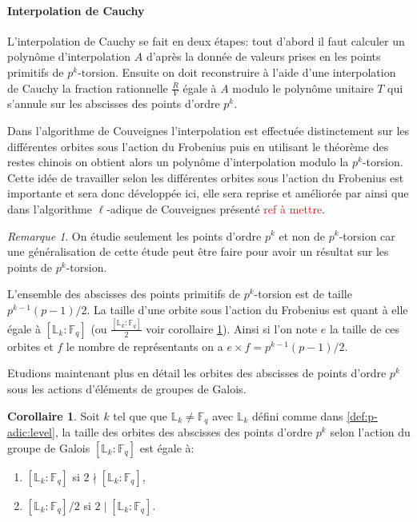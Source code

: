 \documentclass[10pt,a4paper]{book}
\theoremstyle{plain}
\theoremstyle{definition}
\theoremstyle{definition}
\newtheorem{cor}[thm]{Corollaire}
\theoremstyle{definition}
\theoremstyle{definition}
\theoremstyle{remark}
\newtheorem{rem}[thm]{Remarque}
\theoremstyle{remark}
\theoremstyle{definition}
\begin{document}
\paragraph{Interpolation de Cauchy} L'interpolation de Cauchy se fait en deux étapes: tout d'abord il faut calculer un polynôme d'interpolation $A$ d'après la donnée de valeurs prises en les points primitifs de $p^k$-torsion. Ensuite on doit reconstruire à l'aide d'une interpolation de Cauchy la fraction rationnelle $\frac{R}{V}$ égale à $A$ modulo le polynôme unitaire $T$ qui s'annule sur les abscisses des points d'ordre $p^k$. 

Dans l'algorithme de Couveignes \cite{Couveignes96} l'interpolation est effectuée distinctement sur les différentes orbites sous l'action du Frobenius puis en utilisant le théorème des restes chinois on obtient alors un polynôme d'interpolation modulo la $p^k$-torsion. Cette idée de travailler selon les différentes orbites sous l'action du Frobenius est importante et sera donc développée ici, elle sera reprise et améliorée par \cite{DeFeo11} ainsi que dans l'algorithme $\ell$-adique de Couveignes présenté \textcolor{red}{ref à mettre}.

\begin{rem}
On étudie seulement les points d'ordre $p^k$ et non de $p^k$-torsion car une généralisation de cette étude peut être faire pour avoir un résultat sur les points de $p^k$-torsion.
\end{rem}

L'ensemble des abscisses des points primitifs de $p^k$-torsion est de taille $p^{k-1}(p-1)/2$. La taille d'une orbite sous l'action du Frobenius est quant à elle égale à $[\mathbb{L}_k:\mathbb{F}_q]$ (ou $\frac{[\mathbb{L}_k:\mathbb{F}_q]}{2}$ voir corollaire \ref{cor:orb:fro}). Ainsi si l'on note $e$ la taille de ces orbites et $f$ le nombre de représentants on a $e \times f=p^{k-1}(p-1)/2$.

Etudions maintenant plus en détail les orbites des abscisses de points d'ordre $p^k$ sous les actions d'éléments de groupes de Galois.




\begin{cor}
\label{cor:orb:fro}
Soit $k$ tel que que $\mathbb{L}_k \neq \mathbb{F}_q$ avec $\mathbb{L}_k$ défini comme dans \ref{def:p-adic:level}, 
la taille des orbites des abscisses des points d'ordre $p^k$ selon l'action du groupe de Galois $[\mathbb{L}_k:\mathbb{F}_q]$  est égale à:
\begin{enumerate} 
\item $[\mathbb{L}_k:\mathbb{F}_q]$ si $2 \nmid [\mathbb{L}_k:\mathbb{F}_q]$,
\item $[\mathbb{L}_k:\mathbb{F}_q]/2$ si $2 \mid [\mathbb{L}_k:\mathbb{F}_q]$.
\end{enumerate}
\end{cor}
\end{document}

